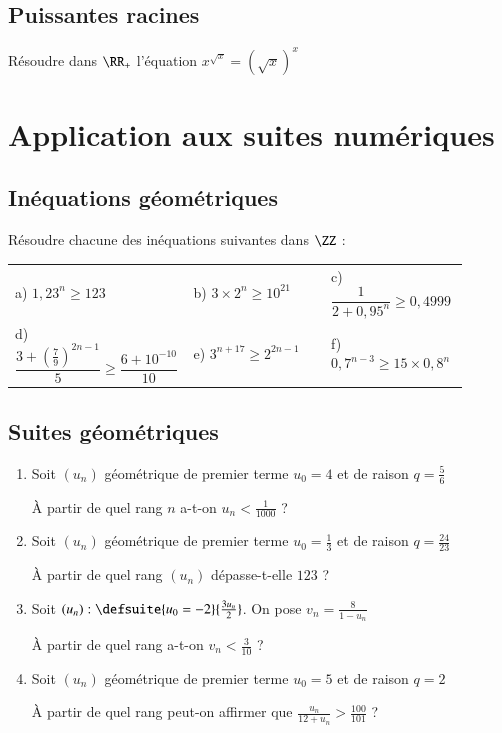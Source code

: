 \documentclass[oneside,12pt]{article}          %
\begin{document}
\subsection{Puissantes racines}
Résoudre dans $\RR_+$ l'équation $x^{\sqrt{x}}=(\sqrt{x})^x$



\section{Application aux suites numériques}

\subsection{Inéquations géométriques}
Résoudre chacune des inéquations suivantes dans $\ZZ$ :\\
\begin{tabular}{p{0.3\linewidth} p{0.3\linewidth} p{0.3\linewidth}}
a) $1, 23^n \geq 123$ & b) $3 \times 2^n \geq 10^{21}$ & c) $\dfrac{1}{2 + 0,95^n} \geq 0,4999$ \\ 
d) $\dfrac{3 + \left(\frac{7}{9}\right)^{2n-1}}{5} \geq \dfrac{6 + 10^{-10}}{10}$ & e) $3^{n+17} \geq 2^{2n-1}$ & f) $0,7^{n-3} \geq 15 \times 0,8^n$ \\
\end{tabular}



\subsection{Suites géométriques}
\begin{enumerate}
    \item Soit $(u_n)$ géométrique de premier terme $u_0 = 4$ et de raison $q = \frac{5}{6}$

    À partir de quel rang $n$ a-t-on $u_n < \frac{1}{1000}$ ?

    \item Soit $(u_n)$ géométrique de premier terme $u_0 = \frac{1}{3}$ et de raison $q = \frac{24}{23}$

    À partir de quel rang $(u_n)$ dépasse-t-elle $123$ ?

    \item Soit $(u_n):\defsuite{u_0=-2}{\frac{3u_n}{2}}$. On pose $v_n = \frac{8}{1 - u_n}$

    À partir de quel rang a-t-on $v_n < \frac{3}{10}$ ?

    \item Soit $(u_n)$ géométrique de premier terme $u_0 = 5$ et de raison $q = 2$

    À partir de quel rang peut-on affirmer que $\frac{u_n}{12 + u_n} > \frac{100}{101}$ ?
\end{enumerate}
\end{document}
